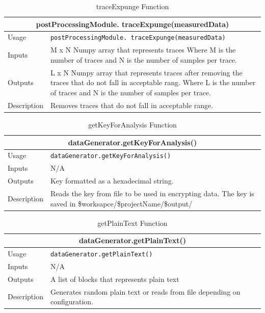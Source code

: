 \documentclass{llncs}
\numberwithin{algorithm}{chapter}
\begin{document}
\begin{table}
\caption{traceExpunge Function}
\begin{tabular}{ |p{2cm}||p{11cm}|  }
 \hline
 \multicolumn{2}{|c|}{\cellcolor{teal}\textbf{postProcessingModule. traceExpunge(measuredData)}} \\
 \hline
 Usage & \texttt{postProcessingModule. traceExpunge(measuredData)}\\ \hline
 Inputs & M x N Numpy array that represents traces Where M is the number of traces and N is the number of samples per trace. \\ \hline
 Outputs & L x N Numpy array that represents traces after removing the traces that do not fall in acceptable rang. Where L is the number of traces and N is the number of samples per trace.  \\ \hline
 Description & Removes traces that do not fall in acceptable range. \\ \hline
\end{tabular}
\end{table}

\begin{table}
\caption{getKeyForAnalysis Function}
\begin{tabular}{ |p{2cm}||p{11cm}|  }
 \hline
 \multicolumn{2}{|c|}{\cellcolor{teal}\textbf{dataGenerator.getKeyForAnalysis()}} \\
 \hline
 Usage & \texttt{dataGenerator.getKeyForAnalysis()}\\ \hline
 Inputs & N/A \\ \hline
 Outputs & Key formatted as a hexadecimal string.  \\ \hline
 Description & Reads the key from file to be used in encrypting data. The key is saved in \$worksapce/\$projectName/\$output/ \\ \hline
\end{tabular}
\end{table}

\begin{table}
\caption{getPlainText Function}
\begin{tabular}{ |p{2cm}||p{11cm}|  }
 \hline
 \multicolumn{2}{|c|}{\cellcolor{teal}\textbf{dataGenerator.getPlainText()}} \\
 \hline
 Usage & \texttt{dataGenerator.getPlainText()}\\ \hline
 Inputs & N/A \\ \hline
 Outputs & A list of blocks that represents plain text  \\ \hline
 Description & Generates random plain text or reads from file depending on configuration. \\ \hline
\end{tabular}
\end{table}
\end{document}
